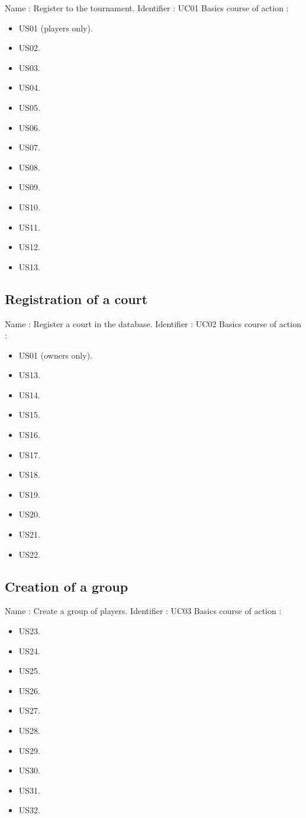 Name : Register to the tournament. \newline
Identifier : UC01 \newline
Basics course of action : \newline
\begin{itemize}
	\item US01 (players only).
	\item US02.
	\item US03.
	\item US04.
	\item US05.
	\item US06.
	\item US07.
	\item US08.
	\item US09.
	\item US10.
	\item US11.
	\item US12.
	\item US13.
\end{itemize}

\subsection{Registration of a court}

Name : Register a court in the database. \newline
Identifier : UC02 \newline
Basics course of action : \newline
\begin{itemize}
	\item US01 (owners only).
	\item US13.
	\item US14.
	\item US15.
	\item US16.
	\item US17.
	\item US18.
	\item US19.
	\item US20.
	\item US21.
	\item US22.
\end{itemize}


\subsection{Creation of a group}

Name : Create a group of players. \newline
Identifier : UC03 \newline
Basics course of action : \newline
\begin{itemize}
	\item US23.
	\item US24.
	\item US25.
	\item US26.
	\item US27.
	\item US28.
	\item US29.
	\item US30.
	\item US31.
	\item US32.
\end{itemize}
